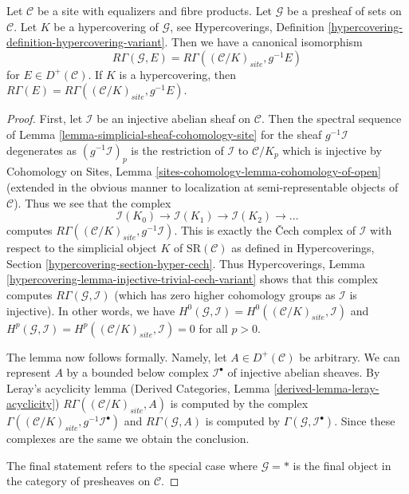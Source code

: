 \begin{lemma}
\label{lemma-compare-cohomology-hypercovering}
Let $\mathcal{C}$ be a site with equalizers and fibre products.
Let $\mathcal{G}$ be a presheaf of sets on
$\mathcal{C}$. Let $K$ be a hypercovering of $\mathcal{G}$, see
Hypercoverings, Definition
\ref{hypercovering-definition-hypercovering-variant}.
Then we have a canonical isomorphism
$$
R\Gamma(\mathcal{G}, E) =
R\Gamma((\mathcal{C}/K)_{site}, g^{-1}E)
$$
for $E \in D^+(\mathcal{C})$. If $K$ is a
hypercovering, then
$R\Gamma(E) = R\Gamma((\mathcal{C}/K)_{site}, g^{-1}E)$.
\end{lemma}

\begin{proof}
First, let $\mathcal{I}$ be an injective abelian sheaf on $\mathcal{C}$.
Then the spectral sequence of
Lemma \ref{lemma-simplicial-sheaf-cohomology-site}
for the sheaf $g^{-1}\mathcal{I}$ degenerates as
$(g^{-1}\mathcal{I})_p$ is the restriction of $\mathcal{I}$
to $\mathcal{C}/K_p$ which is injective by
Cohomology on Sites, Lemma \ref{sites-cohomology-lemma-cohomology-of-open}
(extended in the obvious manner to localization at
semi-representable objects of $\mathcal{C}$).
Thus we see that the complex
$$
\mathcal{I}(K_0) \to \mathcal{I}(K_1) \to \mathcal{I}(K_2) \to \ldots
$$
computes $R\Gamma((\mathcal{C}/K)_{site}, g^{-1}\mathcal{I})$.
This is exactly the {\v C}ech complex of $\mathcal{I}$ with respect
to the simplicial object $K$ of $\text{SR}(\mathcal{C})$ as defined in
Hypercoverings, Section \ref{hypercovering-section-hyper-cech}.
Thus
Hypercoverings, Lemma \ref{hypercovering-lemma-injective-trivial-cech-variant}
shows that this complex computes $R\Gamma(\mathcal{G}, \mathcal{I})$
(which has zero higher cohomology groups as $\mathcal{I}$ is injective).
In other words, we have
$H^0(\mathcal{G}, \mathcal{I}) = H^0((\mathcal{C}/K)_{site}, \mathcal{I})$
and
$H^p(\mathcal{G}, \mathcal{I}) = H^p((\mathcal{C}/K)_{site}, \mathcal{I}) = 0$
for all $p > 0$.

\medskip\noindent
The lemma now follows formally. Namely, let $A \in D^+(\mathcal{C})$
be arbitrary. We can represent $A$ by a bounded below complex
$\mathcal{I}^\bullet$ of injective abelian sheaves. By Leray's acyclicity
lemma (Derived Categories, Lemma \ref{derived-lemma-leray-acyclicity})
$R\Gamma((\mathcal{C}/K)_{site}, A)$
is computed by the complex
$\Gamma((\mathcal{C}/K)_{site}, g^{-1}\mathcal{I}^\bullet)$
and $R\Gamma(\mathcal{G}, A)$ is computed by
$\Gamma(\mathcal{G}, \mathcal{I}^\bullet)$.
Since these complexes are the same we obtain the conclusion.

\medskip\noindent
The final statement refers to the special case where $\mathcal{G} = *$
is the final object in the category of presheaves on $\mathcal{C}$.
\end{proof}

